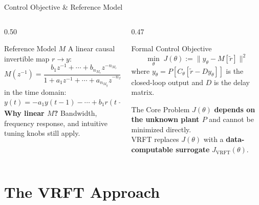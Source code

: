 \documentclass[aspectratio=169]{beamer}
\newcommand{\highlight}[1]{{\color{accentgreen!70!black}\textbf{#1}}}
\newcommand{\JJ}{J_{\mathrm{VRFT}}}
\newcommand{\Jopt}{J}
\begin{document}
\begin{frame}{Control Objective \& Reference Model}
  \begin{columns}[T]
    \begin{column}{0.50\textwidth}
      \begin{block}{Reference Model $M$}
        A linear causal invertible map $r \to y$:
        \[
          M(z^{-1}) = \frac{b_1 z^{-1}+\cdots+b_{n_{M_r}}z^{-n_{M_r}}}{1 + a_1 z^{-1}+\cdots+a_{n_{M_y}}z^{-n_{M_y}}}
        \]
        in the time domain:
        \small
        \[
          y(t) = -a_1 y(t-1) - \cdots + b_1 r(t-1) + \cdots + b_{n_{M_r}} r(t-n_{M_r})
        \]
        \normalsize
        \textbf{Why linear $M$?} Bandwidth, frequency response, and intuitive tuning knobs still apply.
      \end{block}
    \end{column}
    \begin{column}{0.47\textwidth}
      \begin{block}{Formal Control Objective}
        \[
          \min_\theta \; \Jopt(\theta) := \bigl\|y_\theta - M[\tilde{r}]\bigr\|^2
        \]
        where $y_\theta = P[C_\theta[\tilde{r} - Dy_\theta]]$ is the closed-loop output and $D$ is the delay matrix.
      \end{block}
      \vspace{0.3em}
      \begin{alertblock}{The Core Problem}
        $\Jopt(\theta)$ \textbf{depends on the unknown plant $P$} and cannot be minimized directly.\\[0.4em]
        VRFT replaces $\Jopt(\theta)$ with a \highlight{data-computable surrogate} $\JJ(\theta)$.
      \end{alertblock}
    \end{column}
  \end{columns}
\end{frame}

\section{The VRFT Approach}
\end{document}
